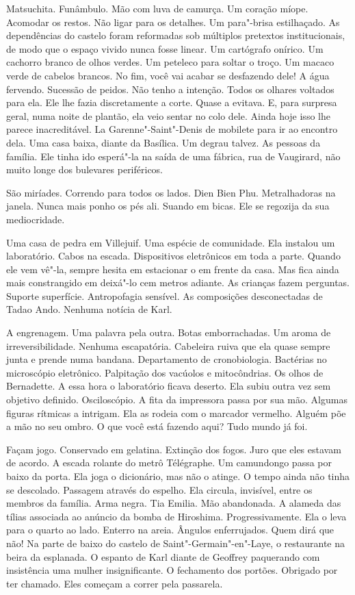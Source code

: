 Matsuchita. Funâmbulo. Mão com luva de camurça. Um coração míope.
Acomodar os restos. Não ligar para os detalhes. Um para"-brisa
estilhaçado. As dependências do castelo foram reformadas sob múltiplos
pretextos institucionais, de modo que o espaço vivido nunca fosse
linear. Um cartógrafo onírico. Um cachorro branco de olhos verdes. Um
peteleco para soltar o troço. Um macaco verde de cabelos brancos. No
fim, você vai acabar se desfazendo dele! A água fervendo. Sucessão de
peidos. Não tenho a intenção. Todos os olhares voltados para ela. Ele
lhe fazia discretamente a corte. Quase a evitava. E, para surpresa
geral, numa noite de plantão, ela veio sentar no colo dele. Ainda hoje
isso lhe parece inacreditável. La Garenne"-Saint"-Denis de mobilete para
ir ao encontro dela. Uma casa baixa, diante da Basílica. Um degrau
talvez. As pessoas da família. Ele tinha ido esperá"-la na saída de uma
fábrica, rua de Vaugirard, não muito longe dos bulevares periféricos.

São miríades. Correndo para todos os lados. Dien Bien Phu. Metralhadoras
na janela. Nunca mais ponho os pés ali. Suando em bicas. Ele se regozija
da sua mediocridade.

Uma casa de pedra em Villejuif. Uma espécie de comunidade. Ela instalou
um laboratório. Cabos na escada. Dispositivos eletrônicos em toda a
parte. Quando ele vem vê"-la, sempre hesita em estacionar o  em frente
da casa. Mas fica ainda mais constrangido em deixá"-lo cem metros
adiante. As crianças fazem perguntas. Suporte superfície. Antropofagia
sensível. As composições desconectadas de Tadao Ando. Nenhuma notícia de
Karl.

A engrenagem. Uma palavra pela outra. Botas emborrachadas. Um aroma de
irreversibilidade. Nenhuma escapatória. Cabeleira ruiva que ela quase
sempre junta e prende numa bandana. Departamento de cronobiologia.
Bactérias no microscópio eletrônico. Palpitação dos vacúolos e
mitocôndrias. Os olhos de Bernadette. A essa hora o laboratório ficava
deserto. Ela subiu outra vez sem objetivo definido. Osciloscópio. A fita
da impressora passa por sua mão. Algumas figuras rítmicas a intrigam.
Ela as rodeia com o marcador vermelho. Alguém põe a mão no seu ombro. O
que você está fazendo aqui? Tudo mundo já foi.

Façam jogo. Conservado em gelatina. Extinção dos fogos. Juro que eles
estavam de acordo. A escada rolante do metrô Télégraphe. Um camundongo
passa por baixo da porta. Ela joga o dicionário, mas não o atinge. O
tempo ainda não tinha se descolado. Passagem através do espelho. Ela
circula, invisível, entre os membros da família. Arma negra. Tia Emilia.
Mão abandonada. A alameda das tílias associada ao anúncio da bomba de
Hiroshima. Progressivamente. Ela o leva para o quarto ao lado. Enterro
na areia. Ângulos enferrujados. Quem dirá que não! Na parte de baixo do
castelo de Saint"-Germain"-en"-Laye, o restaurante na beira da esplanada. O
espanto de Karl diante de Geoffrey paquerando com insistência uma mulher
insignificante. O fechamento dos portões. Obrigado por ter chamado. Eles
começam a correr pela passarela.

